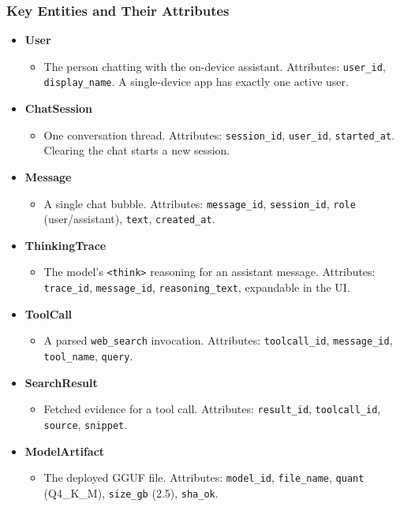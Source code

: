 \documentclass[12pt,a4paper]{report}
\begin{document}
\subsubsection{Key Entities and Their Attributes}
\begin{itemize}
    \item \textbf{User}
    \begin{itemize}
        \item The person chatting with the on-device assistant. Attributes: \texttt{user\_id}, \texttt{display\_name}. A single-device app has exactly one active user.
    \end{itemize}

    \item \textbf{ChatSession}
    \begin{itemize}
        \item One conversation thread. Attributes: \texttt{session\_id}, \texttt{user\_id}, \texttt{started\_at}. Clearing the chat starts a new session.
    \end{itemize}

    \item \textbf{Message}
    \begin{itemize}
        \item A single chat bubble. Attributes: \texttt{message\_id}, \texttt{session\_id}, \texttt{role} (user/assistant), \texttt{text}, \texttt{created\_at}.
    \end{itemize}

    \item \textbf{ThinkingTrace}
    \begin{itemize}
        \item The model's \texttt{<think>} reasoning for an assistant message. Attributes: \texttt{trace\_id}, \texttt{message\_id}, \texttt{reasoning\_text}, expandable in the UI.
    \end{itemize}

    \item \textbf{ToolCall}
    \begin{itemize}
        \item A parsed \texttt{web\_search} invocation. Attributes: \texttt{toolcall\_id}, \texttt{message\_id}, \texttt{tool\_name}, \texttt{query}.
    \end{itemize}

    \item \textbf{SearchResult}
    \begin{itemize}
        \item Fetched evidence for a tool call. Attributes: \texttt{result\_id}, \texttt{toolcall\_id}, \texttt{source}, \texttt{snippet}.
    \end{itemize}

    \item \textbf{ModelArtifact}
    \begin{itemize}
        \item The deployed GGUF file. Attributes: \texttt{model\_id}, \texttt{file\_name}, \texttt{quant} (Q4\_K\_M), \texttt{size\_gb} (2.5), \texttt{sha\_ok}.
    \end{itemize}
\end{itemize}
\end{document}

